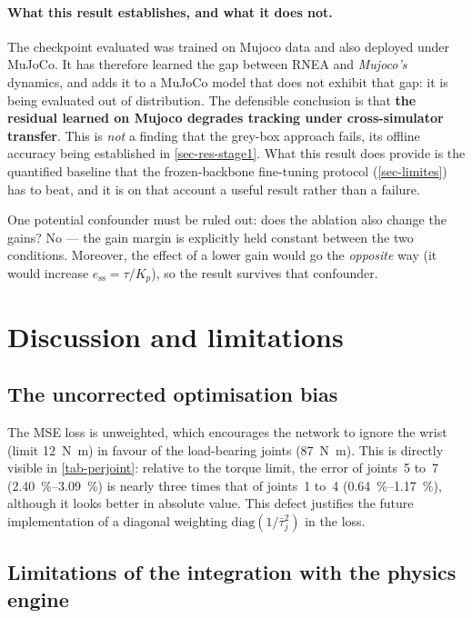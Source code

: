 \documentclass[a4paper, oneside]{article}
\begin{document}
\paragraph{What this result establishes, and what it does not.}
The checkpoint evaluated was trained on Mujoco data and also deployed under
MuJoCo. It has therefore learned the gap between RNEA and \emph{Mujoco's}
dynamics, and adds it to a MuJoCo model that does not exhibit that gap: it is
being evaluated out of distribution. The defensible conclusion is that
\textbf{the residual learned on Mujoco degrades tracking under cross-simulator
transfer}. This is \emph{not} a finding that the grey-box approach fails, its
offline accuracy being established in \cref{sec-res-stage1}. What this result
does provide is the quantified baseline that the frozen-backbone fine-tuning
protocol (\cref{sec-limites}) has to beat, and it is on that account a useful
result rather than a failure.

One potential confounder must be ruled out: does the ablation also change the
gains? No --- the gain margin is explicitly held constant between the two
conditions. Moreover, the effect of a lower gain would go the \emph{opposite}
way (it would increase $e_{\mathrm{ss}} = \tau/K_p$), so the result survives
that confounder.

\section{Discussion and limitations}
\label{sec-discussion}

\subsection{The uncorrected optimisation bias}
\label{sec-res-desequilibre}
The MSE loss is unweighted, which encourages the network to ignore the wrist
(limit \SI{12}{\newton\meter}) in favour of the load-bearing joints
(\SI{87}{\newton\meter}). This is directly visible in \cref{tab-perjoint}:
relative to the torque limit, the error of joints~5 to~7
(\SIrange{2.40}{3.09}{\percent}) is nearly three times that of joints~1 to~4
(\SIrange{0.64}{1.17}{\percent}), although it looks better in absolute value.
This defect justifies the future implementation of a diagonal weighting
$\mathrm{diag}(1/\bar{\tau}_j^2)$ in the loss.

\subsection{Limitations of the integration with the physics engine}
\label{sec-limites-integration}
\end{document}

